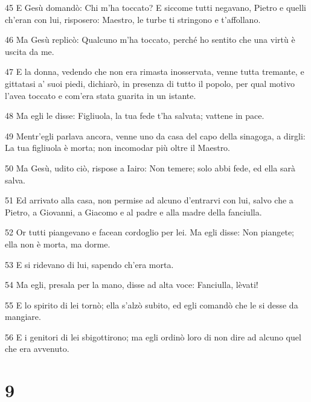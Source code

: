 \par 45 E Gesù domandò: Chi m'ha toccato? E siccome tutti negavano, Pietro e quelli ch'eran con lui, risposero: Maestro, le turbe ti stringono e t'affollano.
\par 46 Ma Gesù replicò: Qualcuno m'ha toccato, perché ho sentito che una virtù è uscita da me.
\par 47 E la donna, vedendo che non era rimasta inosservata, venne tutta tremante, e gittatasi a' suoi piedi, dichiarò, in presenza di tutto il popolo, per qual motivo l'avea toccato e com'era stata guarita in un istante.
\par 48 Ma egli le disse: Figliuola, la tua fede t'ha salvata; vattene in pace.
\par 49 Mentr'egli parlava ancora, venne uno da casa del capo della sinagoga, a dirgli: La tua figliuola è morta; non incomodar più oltre il Maestro.
\par 50 Ma Gesù, udito ciò, rispose a Iairo: Non temere; solo abbi fede, ed ella sarà salva.
\par 51 Ed arrivato alla casa, non permise ad alcuno d'entrarvi con lui, salvo che a Pietro, a Giovanni, a Giacomo e al padre e alla madre della fanciulla.
\par 52 Or tutti piangevano e facean cordoglio per lei. Ma egli disse: Non piangete; ella non è morta, ma dorme.
\par 53 E si ridevano di lui, sapendo ch'era morta.
\par 54 Ma egli, presala per la mano, disse ad alta voce: Fanciulla, lèvati!
\par 55 E lo spirito di lei tornò; ella s'alzò subito, ed egli comandò che le si desse da mangiare.
\par 56 E i genitori di lei sbigottirono; ma egli ordinò loro di non dire ad alcuno quel che era avvenuto.

\chapter{9}

